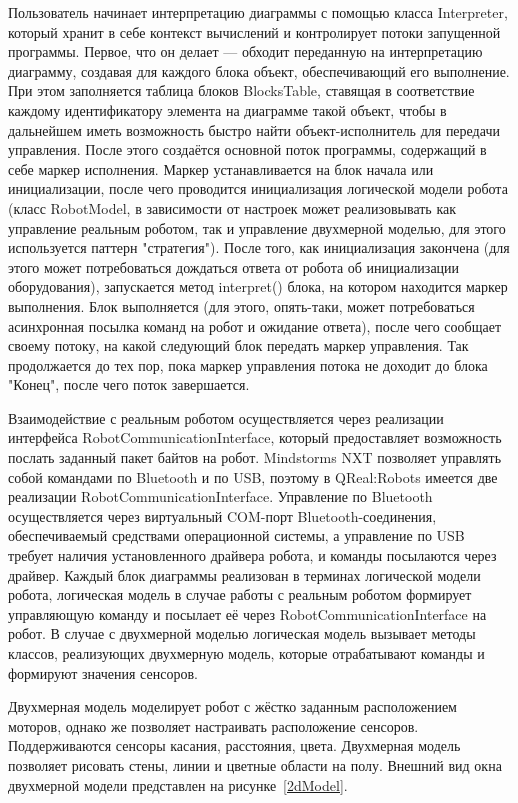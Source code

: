 \documentclass[a4paper]{article}
\begin{document}
Пользователь начинает интерпретацию диаграммы с помощью класса Interpreter, который хранит в себе контекст вычислений и контролирует потоки запущенной программы. Первое, что он делает --- обходит переданную на интерпретацию диаграмму, создавая для каждого блока объект, обеспечивающий его выполнение. При этом заполняется таблица блоков BlocksTable, ставящая в соответствие каждому идентификатору элемента на диаграмме такой объект, чтобы в дальнейшем иметь возможность быстро найти объект-исполнитель для передачи управления. После этого создаётся основной поток программы, содержащий в себе маркер исполнения. Маркер устанавливается на блок начала или инициализации, после чего проводится инициализация логической модели робота (класс RobotModel, в зависимости от настроек может реализовывать как управление реальным роботом, так и управление двухмерной моделью, для этого используется паттерн "стратегия"). После того, как инициализация закончена (для этого может потребоваться дождаться ответа от робота об инициализации оборудования), запускается метод interpret() блока, на котором находится маркер выполнения. Блок выполняется (для этого, опять-таки, может потребоваться асинхронная посылка команд на робот и ожидание ответа), после чего сообщает своему потоку, на какой следующий блок передать маркер управления. Так продолжается до тех пор, пока маркер управления потока не доходит до блока "Конец", после чего поток завершается.

Взаимодействие с реальным роботом осуществляется через реализации интерфейса RobotCommunicationInterface, который предоставляет возможность послать заданный пакет байтов на робот. Mindstorms NXT позволяет управлять собой командами по Bluetooth и по USB, поэтому в QReal:Robots имеется две реализации RobotCommunicationInterface. Управление по Bluetooth осуществляется через виртуальный COM-порт Bluetooth-соединения, обеспечиваемый средствами операционной системы, а управление по USB требует наличия установленного драйвера робота, и команды посылаются через драйвер. Каждый блок диаграммы реализован в терминах логической модели робота, логическая модель в случае работы с реальным роботом формирует управляющую команду и посылает её через RobotCommunicationInterface на робот. В случае с двухмерной моделью логическая модель вызывает методы классов, реализующих двухмерную модель, которые отрабатывают команды и формируют значения сенсоров.

Двухмерная модель моделирует робот с жёстко заданным расположением моторов, однако же позволяет настраивать расположение сенсоров. Поддерживаются сенсоры касания, расстояния, цвета. Двухмерная модель позволяет рисовать стены, линии и цветные области на полу. Внешний вид окна двухмерной модели представлен на рисунке~\ref{2dModel}.
\end{document}
